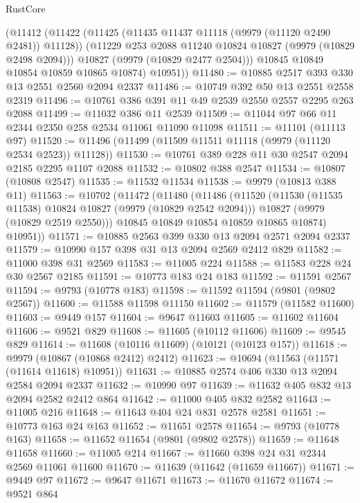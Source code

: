 \begin{lexlean}{RustCore}
\begin{coremodule}
        (@11412
          (@11422
            (@11425 (@11435 @11437 @11118 (@9979 (@11120 @2490 @2481)) @11128))
            (@11229 @253 @2088 @11240 @10824 @10827 (@9979 (@10829 @2498 @2094)))
            @10827
            (@9979 (@10829 @2477 @2504)))
          @10845
          @10849
          @10854
          @10859
          @10865
          @10874)
        @10951))
@11480 := @10885 @2517 @393 @330 @13 @2551 @2560 @2094 @2337
@11486 := @10749 @392 @50 @13 @2551 @2558 @2319
@11496 := @10761 @386 @391 @11 @49 @2539 @2550 @2557 @2295 @263 @2088
@11499 := @11032 @386 @11 @2539
@11509 := @11044 @97 @66 @11 @2344 @2350 @258 @2534 @11061 @11090 @11098
@11511 := @11101 (@11113 @97)
@11520 := @11496 (@11499 (@11509 @11511 @11118 (@9979 (@11120 @2534 @2523)) @11128))
@11530 := @10761 @389 @228 @11 @30 @2547 @2094 @2185 @2295 @1107 @2088
@11532 := @10802 @388 @2547
@11534 := @10807 (@10808 @2547)
@11535 := @11532 @11534
@11538 := @9979 (@10813 @388 @11)
@11563 := @10702
    (@11472
      (@11480
        (@11486
          (@11520
            (@11530 (@11535 @11538) @10824 @10827 (@9979 (@10829 @2542 @2094)))
            @10827
            (@9979 (@10829 @2519 @2550)))
          @10845
          @10849
          @10854
          @10859
          @10865
          @10874)
        @10951))
@11571 := @10885 @2563 @399 @330 @13 @2094 @2571 @2094 @2337
@11579 := @10990 @157 @398 @31 @13 @2094 @2569 @2412 @829
@11582 := @11000 @398 @31 @2569
@11583 := @11005 @224
@11588 := @11583 @228 @24 @30 @2567 @2185
@11591 := @10773 @183 @24 @183
@11592 := @11591 @2567
@11594 := @9793 (@10778 @183)
@11598 := @11592 @11594 (@9801 (@9802 @2567))
@11600 := @11588 @11598 @11150
@11602 := @11579 (@11582 @11600)
@11603 := @9449 @157
@11604 := @9647 @11603
@11605 := @11602 @11604
@11606 := @9521 @829
@11608 := @11605 (@10112 @11606)
@11609 := @9545 @829
@11614 := @11608 (@10116 @11609) (@10121 (@10123 @157))
@11618 := @9979 (@10867 (@10868 @2412) @2412)
@11623 := @10694 (@11563 (@11571 (@11614 @11618) @10951))
@11631 := @10885 @2574 @406 @330 @13 @2094 @2584 @2094 @2337
@11632 := @10990 @97
@11639 := @11632 @405 @832 @13 @2094 @2582 @2412 @864
@11642 := @11000 @405 @832 @2582
@11643 := @11005 @216
@11648 := @11643 @404 @24 @831 @2578 @2581
@11651 := @10773 @163 @24 @163
@11652 := @11651 @2578
@11654 := @9793 (@10778 @163)
@11658 := @11652 @11654 (@9801 (@9802 @2578))
@11659 := @11648 @11658
@11660 := @11005 @214
@11667 := @11660 @398 @24 @31 @2344 @2569 @11061 @11600
@11670 := @11639 (@11642 (@11659 @11667))
@11671 := @9449 @97
@11672 := @9647 @11671
@11673 := @11670 @11672
@11674 := @9521 @864

\end{coremodule}
\end{lexlean}
